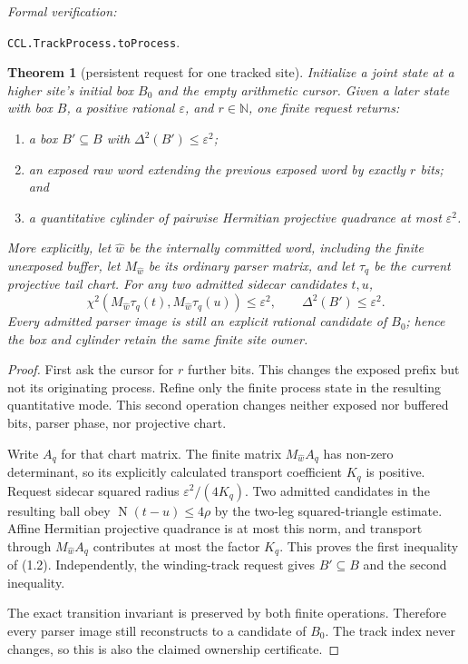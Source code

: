 \documentclass[10pt]{article}
\newtheorem{theorem}{Theorem}[section]
\theoremstyle{definition}
\theoremstyle{remark}
\newcommand{\N}{\mathbb{N}}
\newcommand{\Norm}{\operatorname{N}}
\newcommand{\leanref}[1]{\par\smallskip\noindent
  \emph{Formal verification:}\par\nobreak
  {\raggedright\nolinkurl{#1}.\par}}
\begin{document}
\leanref{CCL.TrackProcess.toProcess}

\begin{theorem}[persistent request for one tracked site]
\label{thm:persistent-site-request}
Initialize a joint state at a higher site's initial box $B_0$ and the empty
arithmetic cursor.  Given a later state with box $B$, a positive rational
$\varepsilon$, and $r\in\N$, one finite request returns:
\begin{enumerate}
\item a box $B'\subseteq B$ with
      $\Delta^2(B')\le\varepsilon^2$;
\item an exposed raw word extending the previous exposed word by exactly
      $r$ bits; and
\item a quantitative cylinder of pairwise Hermitian projective quadrance at most
      $\varepsilon^2$.
\end{enumerate}
More explicitly, let $\widehat w$ be the internally committed word, including
the finite unexposed buffer, let $M_{\widehat w}$ be its ordinary parser
matrix, and let $\tau_q$ be the current projective tail chart.  For any two
admitted sidecar candidates $t,u$,
\[
 \chi^2\!\left(M_{\widehat w}\tau_q(t),
                  M_{\widehat w}\tau_q(u)\right)
 \le\varepsilon^2,
 \qquad \Delta^2(B')\le\varepsilon^2.
\tag{1.2}
\]
Every admitted parser image is still an explicit rational candidate of
$B_0$; hence the box and cylinder retain the same finite site owner.
\end{theorem}

\begin{proof}
First ask the cursor for $r$ further bits.  This changes the exposed prefix
but not its originating process.  Refine only the finite process state in the
resulting quantitative mode.  This second operation changes neither exposed
nor buffered bits, parser phase, nor projective chart.

Write $A_q$ for that chart matrix.  The finite matrix
$M_{\widehat w}A_q$ has non-zero determinant, so its explicitly calculated
transport coefficient $K_q$ is positive.  Request sidecar squared radius
$\varepsilon^2/(4K_q)$.  Two admitted candidates in the resulting ball obey
$\Norm(t-u)\le4\rho$ by the two-leg squared-triangle estimate.  Affine
Hermitian projective quadrance is at most this norm, and transport through
$M_{\widehat w}A_q$ contributes at most the factor $K_q$.  This proves the
first inequality of (1.2).  Independently, the winding-track request gives
$B'\subseteq B$ and the second inequality.

The exact transition invariant is preserved by both finite operations.
Therefore every parser image still reconstructs to a candidate of $B_0$.
The track index never changes, so this is also the claimed ownership
certificate.
\end{proof}
\end{document}
